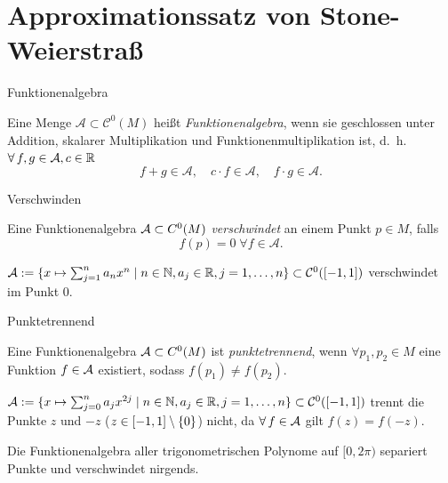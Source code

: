 \section{Approximationssatz von Stone-Weierstraß}

\begin{frame}{Funktionenalgebra}
    \begin{defi}[Funktionenalgebra]
        Eine Menge \( \mathcal{A} \subset \mathcal{C}^0(M) \) heißt 
        \textit{Funktionenalgebra}, wenn sie geschlossen unter Addition, 
        skalarer Multiplikation und Funktionenmultiplikation ist, 
        d.~h. \( \forall f,g \in \A, c \in \mathbb{R} \)
        \[ f + g \in \mathcal{A}, \quad c \cdot f \in \mathcal{A}, \quad f \cdot g \in \mathcal{A}. \]
    \end{defi}
\end{frame}

\begin{frame}{Verschwinden}
    \begin{defi}[Verschwinden]
        Eine Funktionenalgebra \(\mathcal{A} \subset C^0(M)\) 
        \textit{verschwindet} an einem Punkt \(p \in M\), falls 
        \[ f(p) = 0 \;\forall f \in \mathcal{A}. \]
    \end{defi}
    \pause
    \begin{bsp}
        \( \mathcal{A} := \{ x \mapsto \sum_{j=1}^n a_n x^n \;|\; n\in \mathbb{N}, a_j \in \mathbb{R}, j = 1,\ldots, n \} \subset \mathcal{C}^0([-1,1]) \) 
        verschwindet im Punkt \(0\).
    \end{bsp}
\end{frame}

\begin{frame}{Punktetrennend}
    \begin{defi}
        Eine Funktionenalgebra \(\mathcal{A} \subset C^0(M)\) ist \textit{punktetrennend}, 
        wenn \( \forall p_1, p_2 \in M \) eine Funktion \(f \in \mathcal{A}\) existiert, 
        sodass \( f(p_1) \neq f(p_2) \).
    \end{defi}
    \pause
    \begin{bsp}
        \( \mathcal{A} := \{ x \mapsto \sum_{j=0}^n a_{j} x^{2j} \;|\; n\in\mathbb{N}, a_j \in \mathbb{R}, j = 1,\ldots, n \} 
        \subset \mathcal{C}^0([-1,1]) \)
        trennt die Punkte \( z \) und \(-z\) (\(z \in [-1,1] \setminus \{0\} \)) nicht, da \( \forall f \in \A \) gilt 
        \( f(z) = f(-z) \).
    \end{bsp}
    \pause
    \begin{bsp}
        Die Funktionenalgebra aller trigonometrischen Polynome auf \( [0,2\pi) \) 
        separiert Punkte und verschwindet nirgends.
    \end{bsp}
\end{frame}

